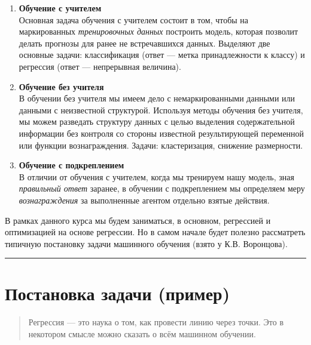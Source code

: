 \documentclass[11pt,a4paper]{article}
\renewcommand{\linethickness}{0.1ex}
\begin{document}
\begin{enumerate}
\def\labelenumi{\arabic{enumi}.}
\item
  \textbf{Обучение с учителем}\\
  Основная задача обучения с учителем состоит в том, чтобы на
  маркированных \emph{тренировочных данных} построить модель, которая
  позволит делать прогнозы для ранее не встречавшихся данных. Выделяют
  две основные задачи: классификация (ответ --- метка принадлежности к
  классу) и регрессия (ответ --- непрерывная величина).
\item
  \textbf{Обучение без учителя}\\
  В обучении без учителя мы имеем дело с немаркированными данными или
  данными с неизвестной структурой. Используя методы обучения без
  учителя, мы можем разведать структуру данных с целью выделения
  содержательной информации без контроля со стороны известной
  результирующей переменной или функции вознаграждения. Задачи:
  кластеризация, снижение размерности.
\item
  \textbf{Обучение с подкреплением}\\
  В отличии от обучения с учителем, когда мы тренируем нашу модель, зная
  \emph{правильный ответ} заранее, в обучении с подкреплением мы
  определяем меру \emph{вознаграждения} за выполненные агентом отдельно
  взятые действия.
\end{enumerate}

    В рамках данного курса мы будем заниматься, в основном, регрессией и
оптимизацией на основе регрессии. Но в самом начале будет полезно
рассматреть типичную постановку задачи машинного обучения (взято у К.В.
Воронцова).

    \begin{center}\rule{0.5\linewidth}{\linethickness}\end{center}

    \hypertarget{ux43fux43eux441ux442ux430ux43dux43eux432ux43aux430-ux437ux430ux434ux430ux447ux438-ux43fux440ux438ux43cux435ux440}{%
\section{Постановка задачи
(пример)}\label{ux43fux43eux441ux442ux430ux43dux43eux432ux43aux430-ux437ux430ux434ux430ux447ux438-ux43fux440ux438ux43cux435ux440}}

\begin{quote}
Регрессия --- это наука о том, как провести линию через точки. Это в
некотором смысле можно сказать о всём машинном обучении.
\end{quote}
\end{document}
